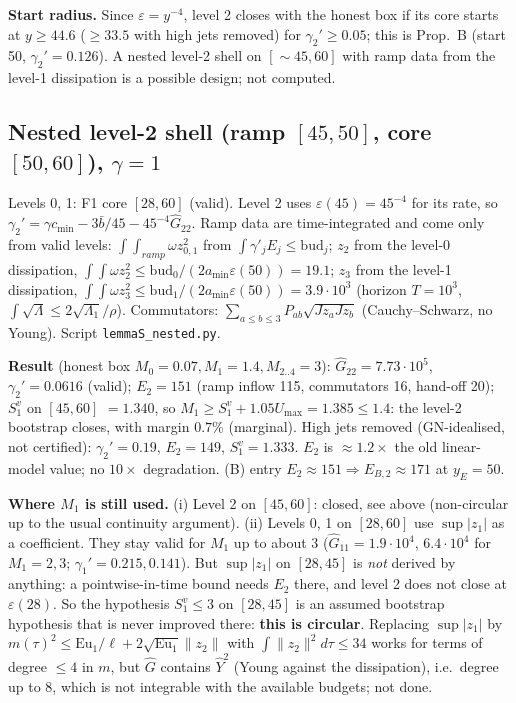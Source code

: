 \documentclass[11pt]{article}
\begin{document}
\textbf{Start radius.} Since $\varepsilon=y^{-4}$, level 2 closes with the honest box if its core starts at $y\ge44.6$ ($\ge33.5$ with high jets removed) for $\gamma_2'\ge0.05$; this is Prop.~B (start 50, $\gamma_2'=0.126$). A nested level-2 shell on $[\sim45,60]$ with ramp data from the level-1 dissipation is a possible design; not computed.
\subsection*{Nested level-2 shell (ramp $[45,50]$, core $[50,60]$), $\gamma=1$}
Levels 0, 1: F1 core $[28,60]$ (valid). Level 2 uses $\varepsilon(45)=45^{-4}$ for its rate, so $\gamma_2'=\gamma c_{\min}-3\bar b/45-45^{-4}\hat G_{22}$. Ramp data are time-integrated and come only from valid levels: $\int\!\!\int_{ramp}\omega z_{0,1}^2$ from $\int\gamma'_jE_j\le \mathrm{bud}_j$; $z_2$ from the level-0 dissipation, $\int\!\!\int\omega z_2^2\le \mathrm{bud}_0/(2a_{\min}\varepsilon(50))=19.1$; $z_3$ from the level-1 dissipation, $\int\!\!\int\omega z_3^2\le \mathrm{bud}_1/(2a_{\min}\varepsilon(50))=3.9\cdot10^3$ (horizon $T=10^3$, $\int\!\sqrt\Lambda\le2\sqrt{\Lambda_1}/\rho$). Commutators: $\sum_{a\le b\le3}P_{ab}\sqrt{Jz_aJz_b}$ (Cauchy--Schwarz, no Young). Script \texttt{lemmaS\_nested.py}.

\textbf{Result} (honest box $M_0=0.07,M_1=1.4,M_{2..4}=3$): $\hat G_{22}=7.73\cdot10^5$, $\gamma_2'=0.0616$ (valid); $E_2=151$ (ramp inflow 115, commutators 16, hand-off 20); $S_1^v$ on $[45,60]$ $=1.340$, so $M_1\ge S_1^v+1.05U_{\max}=1.385\le1.4$: the level-2 bootstrap closes, with margin $0.7\%$ (marginal). High jets removed (GN-idealised, not certified): $\gamma_2'=0.19$, $E_2=149$, $S_1^v=1.333$. $E_2$ is $\approx1.2\times$ the old linear-model value; no $10\times$ degradation. (B) entry $E_2\approx151\Rightarrow E_{B,2}\approx171$ at $y_E=50$.

\textbf{Where $M_1$ is still used.} (i) Level 2 on $[45,60]$: closed, see above (non-circular up to the usual continuity argument). (ii) Levels 0, 1 on $[28,60]$ use $\sup|z_1|$ as a coefficient. They stay valid for $M_1$ up to about $3$ ($\hat G_{11}=1.9\cdot10^4$, $6.4\cdot10^4$ for $M_1=2,3$; $\gamma_1'=0.215,0.141$). But $\sup|z_1|$ on $[28,45]$ is \emph{not} derived by anything: a pointwise-in-time bound needs $E_2$ there, and level 2 does not close at $\varepsilon(28)$. So the hypothesis $S_1^v\le3$ on $[28,45]$ is an assumed bootstrap hypothesis that is never improved there: \textbf{this is circular}. Replacing $\sup|z_1|$ by $m(\tau)^2\le \mathrm{Eu}_1/\ell+2\sqrt{\mathrm{Eu}_1}\|z_2\|$ with $\int\|z_2\|^2d\tau\le34$ works for terms of degree $\le4$ in $m$, but $\hat G$ contains $\hat Y^2$ (Young against the dissipation), i.e.\ degree up to 8, which is not integrable with the available budgets; not done.
\end{document}
